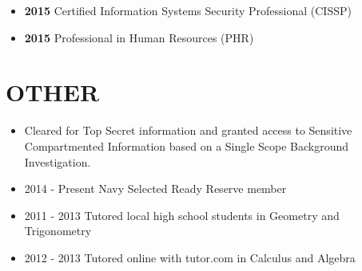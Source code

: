 \documentclass[10pt]{article}
\begin{document}

\begin{itemize}
\itemsep1pt\parskip0pt
\item
  \textbf{2015} Certified Information Systems Security Professional
  (CISSP)
\item
  \textbf{2015} Professional in Human Resources (PHR)
\end{itemize}

\section{OTHER}\label{other}

\begin{itemize}
\itemsep1pt\parskip0pt
\item
  Cleared for Top Secret information and granted access to Sensitive
  Compartmented Information based on a Single Scope Background
  Investigation.
\item
  2014 - Present Navy Selected Ready Reserve member
\item
  2011 - 2013 Tutored local high school students in Geometry and
  Trigonometry
\item
  2012 - 2013 Tutored online with tutor.com in Calculus and Algebra
\end{itemize}

\end{document}

